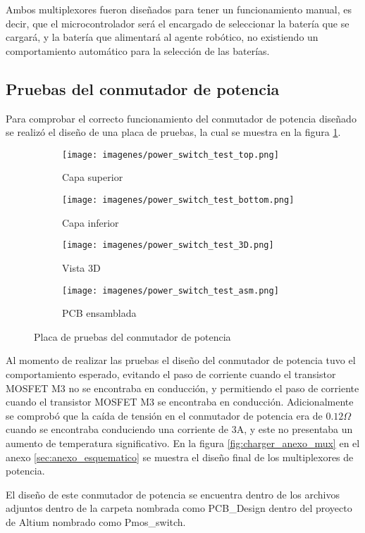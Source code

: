     Ambos multiplexores fueron diseñados para tener un funcionamiento manual, 
    es decir, que el microcontrolador será el encargado de seleccionar la batería
    que se cargará, y la batería que alimentará al agente robótico, no existiendo
    un comportamiento automático para la selección de las baterías.

    \subsection{Pruebas del conmutador de potencia}

    Para comprobar el correcto funcionamiento del conmutador de potencia diseñado
    se realizó el diseño de una placa de pruebas, la cual se muestra en la figura
    \ref{fig:power_switch_test}.

    \begin{figure}[H]
        \centering

        \begin{subfigure}{0.45\textwidth}
            \centering
            \texttt{[image: imagenes/power\_switch\_test\_top.png]}
            \caption{Capa superior}
        \end{subfigure}
        \begin{subfigure}{0.45\textwidth}
            \centering
            \texttt{[image: imagenes/power\_switch\_test\_bottom.png]}
            \caption{Capa inferior}
        \end{subfigure}
        \vfill
        \begin{subfigure}{0.45\textwidth}
            \centering
            \texttt{[image: imagenes/power\_switch\_test\_3D.png]}
            \caption{Vista 3D} 
        \end{subfigure}
        \begin{subfigure}{0.45\textwidth}
            \centering
            \texttt{[image: imagenes/power\_switch\_test\_asm.png]}
            \caption{PCB ensamblada}
        \end{subfigure}

        \caption{Placa de pruebas del conmutador de potencia}
        \label{fig:power_switch_test}
    \end{figure}

        Al momento de realizar las pruebas el diseño del conmutador de potencia
        tuvo el comportamiento esperado, evitando el paso de corriente cuando
        el transistor MOSFET M3 no se encontraba en conducción, y permitiendo
        el paso de corriente cuando el transistor MOSFET M3 se encontraba en
        conducción. Adicionalmente se comprobó que la caída de tensión en el
        conmutador de potencia era de $0.12\Omega$ cuando se encontraba conduciendo
        una corriente de $3\text{A}$, y este no presentaba un aumento de temperatura
        significativo. En la figura \ref{fig:charger_anexo_mux} en el anexo \ref{sec:anexo_esquematico}
        se muestra el diseño final de los multiplexores de potencia.

        El diseño de este conmutador de potencia se encuentra dentro de los archivos
        adjuntos dentro de la carpeta nombrada como PCB\_Design dentro del proyecto
        de Altium nombrado como Pmos\_switch. 



    

    